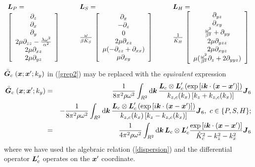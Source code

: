 \begin{eqnarray} \label{Labdef}
\begin{array}{lll}
{\mbox{\boldmath$\mit L$\unboldmath}}_{P}=&\qquad{\mbox{\boldmath$\mit L$\unboldmath}}_{S}=&\qquad{\mbox{\boldmath$\mit L$\unboldmath}}_{H}=\\
\left[\begin{array}{c}
\partial_{z} \\
\partial_{x} \\ 
\partial_{y} \\ 
2 \mu \partial_{zz} - {\lambda \omega^{2}\over \alpha^2}\\
    2 \mu \partial_{xz} \\ 
   2 \mu \partial_{yz}
\end{array}\right]&\qquad
\frac{\omega }{\beta \hat{K}_{S}}\,
\left[\begin{array}{c}
\partial_{x} \\-\partial_{z} \\ 0 \\
2 \mu \partial_{xz}\\  
   \mu (-\partial_{zz} + \partial_{xx}) \\ 
   \mu \partial_{xy} 
\end{array}\right]&\qquad
\frac{1 }{\hat{K}_{H}}\,
\left[\begin{array}{c}
   \partial_{yz} \\
\partial_{xy} \\ 
{\omega^{2}\over \beta^2} + \partial_{yy} \\ 
 2 \mu \partial_{yzz}\\
    2 \mu \partial_{xyz} \\ 
   \mu ({\omega^{2}\over \beta^2}\partial_{z} + 2 \partial_{yyz}) 
\end{array}\right]
\end{array}
\end{eqnarray}
$\stackrel{\scriptscriptstyle _{\,\,\circ}}{ \mbox{\boldmath$\mit G$\unboldmath}}_{c}({\mbox{\boldmath$\mit x$\unboldmath}};{{\mbox{\boldmath$\mit x$\unboldmath}}}^{\prime};k_y)$  in  (\ref{grep2}) may be replaced 
with the {\em equivalent\/} expression
\begin{eqnarray}\label{grepc}
\stackrel{\scriptscriptstyle _{\,\,\circ}}{ \mbox{\boldmath$\mit G$\unboldmath}}_{c}({\mbox{\boldmath$\mit x$\unboldmath}};{{\mbox{\boldmath$\mit x$\unboldmath}}}^{\prime};k_y) &=&
{\frac{1}{8{ \pi }^{2} \rho \omega^2}}\int_{{R}^{2}} {\rm d}{\mbox{\boldmath$\mit k$\unboldmath}}\,  
\frac{
{\mbox{\boldmath$\mit L$\unboldmath}}_{c} \otimes {\mbox{\boldmath$\mit L$\unboldmath}}_{c}^{\prime}
\left(
\exp \left[{i {\mbox{\boldmath$\mit k$\unboldmath}}  \cdot  ({\mbox{\boldmath$\mit x$\unboldmath}}-{\mbox{\boldmath$\mit x$\unboldmath}}^{\prime})}\right]\right)  
}{ {k}_{z, c }({k}_{x})\,[{k}_{z}+{k}_{z, c }({k}_{x})]} {\mbox{\boldmath$\mit J$\unboldmath}}_{6}\nonumber\\
&&-
{\frac{1}{8  { \pi }^{2}\rho \omega^2}}\int_{{R}^{2}} {\rm d}{\mbox{\boldmath$\mit k$\unboldmath}}\,  
\frac{{\mbox{\boldmath$\mit L$\unboldmath}}_{c} \otimes {\mbox{\boldmath$\mit L$\unboldmath}}_{c}^{\prime}\left(
\exp \left[{i {\mbox{\boldmath$\mit k$\unboldmath}}  \cdot  ({\mbox{\boldmath$\mit x$\unboldmath}}-{\mbox{\boldmath$\mit x$\unboldmath}}^{\prime})}\right]\right)  
}{{k}_{z, c }({k}_{x})\, [{k}_{z}-{k}_{z, c }({k}_{x})]} {\mbox{\boldmath$\mit J$\unboldmath}}_{6},\  
c\in\{ P, S , H\};\nonumber\\
&=& \frac{1}{4{ \pi }^{2}\rho \omega^2}
\int_{{R}^{2}} {\rm d}{\mbox{\boldmath$\mit k$\unboldmath}}\, {\mbox{\boldmath$\mit L$\unboldmath}}_{c} \otimes {\mbox{\boldmath$\mit L$\unboldmath}}_{c}^{\prime}
\frac{
\exp \left[{i {\mbox{\boldmath$\mit k$\unboldmath}}  \cdot  ({\mbox{\boldmath$\mit x$\unboldmath}}-{\mbox{\boldmath$\mit x$\unboldmath}}^{\prime})}\right]  
}{ \hat{K}^{2}_{ c } - {k}^{2}_{z} - {k}^{2}_{x}} {\mbox{\boldmath$\mit J$\unboldmath}}_{6}
\end{eqnarray} 
where we have used the algebraic relation (\ref{dispersion}) and
 the differential operator ${\mbox{\boldmath$\mit L$\unboldmath}}_{c}^{\prime}$ operates on the
${\mbox{\boldmath$\mit x$\unboldmath}}^{\prime}$ coordinate. 


